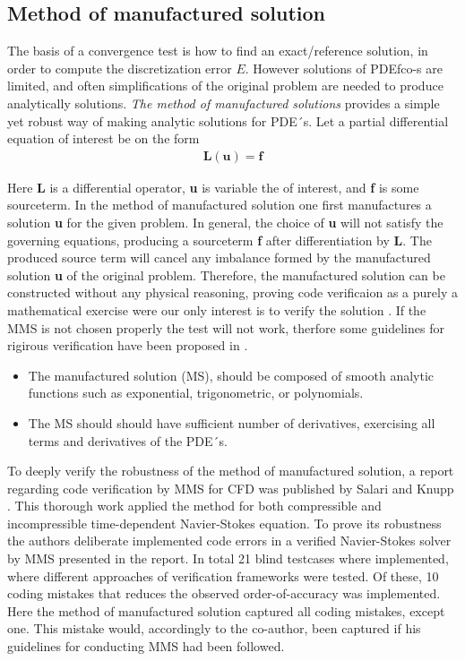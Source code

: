 \subsection{Method of manufactured solution}
The basis of a convergence test is how to find an exact/reference solution, in order to compute the discretization error $E$. However solutions of PDEƒco-s are limited, and often simplifications of the original problem are needed to produce analytically solutions.  \textit{The method of manufactured solutions} provides a simple yet robust way of making analytic solutions for PDE´s. 
Let a  partial differential equation of interest be on the form
\begin{align*}
\textbf{L}(\textbf{u}) = \textbf{f}
\end{align*}

Here \textbf{L} is a differential operator, \textbf{u} is variable the of interest, and \textbf{f} is some sourceterm. In the method of manufactured solution one first manufactures a solution \textbf{u} for the given problem. In general, the choice of \textbf{u} will not satisfy the governing equations, producing a sourceterm  \textbf{f} after differentiation by \textbf{L}. The produced source term will cancel any imbalance formed by the manufactured solution \textbf{u} of the original problem. Therefore, the manufactured solution can be constructed without any physical reasoning, proving code verificaion as a purely a mathematical exercise were our only interest is to verify the solution \cite{Roache2002}. 
\newpage
If the MMS is not chosen properly the test will not work, therfore some guidelines for rigirous verification have been proposed in \cite{Etienne2006, Biggs, Roache2002}. 

\begin{itemize}
\item The manufactured solution (MS), should be composed of smooth analytic functions such as exponential, trigonometric, or polynomials.
\item The MS should should have sufficient number of derivatives, exercising all terms and derivatives of the PDE´s. 
\end{itemize}

To deeply verify the robustness of the method of manufactured solution,  a report regarding code verification by MMS for CFD was published by Salari and Knupp \cite{Biggs}. This thorough work applied the method for both compressible and incompressible time-dependent Navier-Stokes equation. To prove its robustness the authors deliberate implemented  code errors in a verified Navier-Stokes solver by MMS presented in the report. In total 21 blind testcases where implemented, where different approaches of verification frameworks were tested. 
Of these, 10 coding mistakes that reduces the observed order-of-accuracy was implemented. Here the method of manufactured solution captured all coding mistakes, except one. This mistake would, accordingly to the co-author, been captured if his guidelines for conducting MMS had been followed. \\

